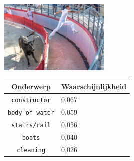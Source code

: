 \begin{figure}
\begin{subfigure}{\textwidth}
    \centering
    \begin{minipage}[t][3.5cm]{.5\linewidth}
    \centering
    \vspace{0pt}
    \includegraphics[height=3.5cm]{Images/LDA/7446693604.jpg}
    \end{minipage}\hfill
    \begin{minipage}[t]{.5\textwidth}
    \centering
    \vspace{0pt}
    \begin{tabular}{cl}
            Onderwerp                           & Waarschijnlijkheid\\
            \hline
            \texttt{constructor}             & 0,067 \\
            \texttt{body of water}                   & 0,059 \\
            \texttt{stairs/rail}                 & 0,056 \\
            \texttt{boats}           & 0,040 \\
            \texttt{cleaning}        & 0,026\\
            \hline
        \end{tabular}
    \end{minipage}
\end{subfigure}

\vspace*{4mm}


\end{figure}

